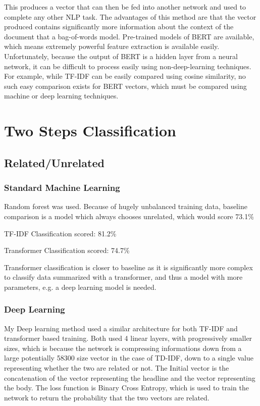 \documentclass{article}
\begin{document}
		This produces a vector that can then be fed into another network and used to complete any other NLP task.
		The advantages of this method are that the vector produced contains significantly more information about the context of the document that a bag-of-words model.
		Pre-trained models of BERT are available, which means extremely powerful feature extraction is available easily.
		Unfortunately, because the output of BERT is a hidden layer from a neural network, it can be difficult to process easily using non-deep-learning techniques.
		For example, while TF-IDF can be easily compared using cosine similarity, no such easy comparison exists for BERT vectors, which must be compared using machine or deep learning techniques.


\section{Two Steps Classification}

	\subsection{Related/Unrelated}

		\subsubsection{Standard Machine Learning}
			Random forest was used.
			Because of hugely unbalanced training data, baseline comparison is a model which always chooses unrelated, which would score 73.1\%

			TF-IDF Classification scored: 81.2\%

			Transformer Classification scored: 74.7\%

			Transformer classification is closer to baseline as it is significantly more complex to classify data summarized with a transformer, and thus a model with more parameters, e.g. a deep learning model is needed.

		\subsubsection{Deep Learning}

			My Deep learning method used a similar architecture for both TF-IDF and transformer based training.
			Both used 4 linear layers, with progressively smaller sizes, which is because the network is compressing informations down from a large potentially 58300 size vector in the case of TD-IDF, down to a single value representing whether the two are related or not.
			The Initial vector is the concatenation of the vector representing the headline and the vector representing the body.
			The loss function is Binary Cross Entropy, which is used to train the network to return the probability that the two vectors are related.
\end{document}
